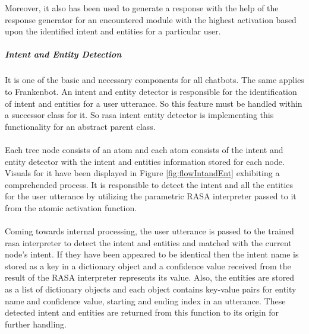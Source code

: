 \noindent
Moreover, it also has been used to generate a response with the help of the response generator for an encountered module with the highest activation based upon the identified intent and entities for a particular user.

\subparagraph*{Intent and Entity Detection}
It is one of the basic and necessary components for all chatbots. The same applies to Frankenbot. An intent and entity detector is responsible for the identification of intent and entities for a user utterance. So this feature must be handled within a successor class for it. So rasa intent entity detector is implementing this functionality for an abstract parent class.
\\~\\
Each tree node consists of an atom and each atom consists of the intent and entity detector with the intent and entities information stored for each node. Visuals for it have been displayed in Figure \ref{fig:flowIntandEnt} exhibiting a comprehended process. It is responsible to detect the intent and all the entities for the user utterance by utilizing the parametric RASA interpreter passed to it from the atomic activation function.
\\~\\
Coming towards internal processing, the user utterance is passed to the trained rasa interpreter to detect the intent and entities and matched with the current node's intent. If they have been appeared to be identical then the intent name is stored as a key in a dictionary object and a confidence value received from the result of the RASA interpreter represents its value. Also, the entities are stored as a list of dictionary objects and each object contains key-value pairs for entity name and confidence value, starting and ending index in an utterance. These detected intent and entities are returned from this function to its origin for further handling.


